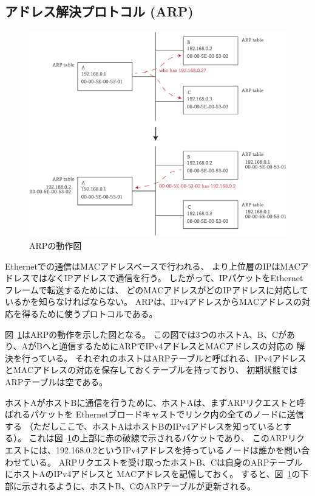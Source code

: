 \subsection{アドレス解決プロトコル (ARP)} \label{sec:arp}

\begin{figure}[tb]
    \centering
    \includegraphics[width=14cm,pagebox=artbox]{figs/arp.pdf}
    \caption{ARPの動作図}
    \label{fig:arp}
\end{figure}

Ethernetでの通信はMACアドレスベースで行われる、
より上位層のIPはMACアドレスではなくIPアドレスで通信を行う。
したがって、IPパケットをEthernetフレームで転送するためには、
どのMACアドレスがどのIPアドレスに対応しているかを知らなければならない。
ARPは、IPv4アドレスからMACアドレスの対応を得るために使うプロトコルである。

図~\ref{fig:arp}はARPの動作を示した図となる。
この図では3つのホストA、B、Cがあり、AがBへと通信するためにARPでIPv4アドレスとMACアドレスの対応の
解決を行っている。
それぞれのホストはARPテーブルと呼ばれる、IPv4アドレスとMACアドレスの対応を保存しておくテーブルを持っており、
初期状態ではARPテーブルは空である。

ホストAがホストBに通信を行うために、ホストAは、まずARPリクエストと呼ばれるパケットを
Ethernetブロードキャストでリンク内の全てのノードに送信する
（ただしここで、ホストAはホストBのIPv4アドレスを知っているとする）。
これは図~\ref{fig:arp}の上部に赤の破線で示されるパケットであり、
このARPリクエストには、192.168.0.2というIPv4アドレスを持っているノードは誰かを問い合わせている。
ARPリクエストを受け取ったホストB、Cは自身のARPテーブルにホストAのIPv4アドレスと
MACアドレスを記憶しておく。
すると、図~\ref{fig:arp}の下部に示されるように、ホストB、CのARPテーブルが更新される。

